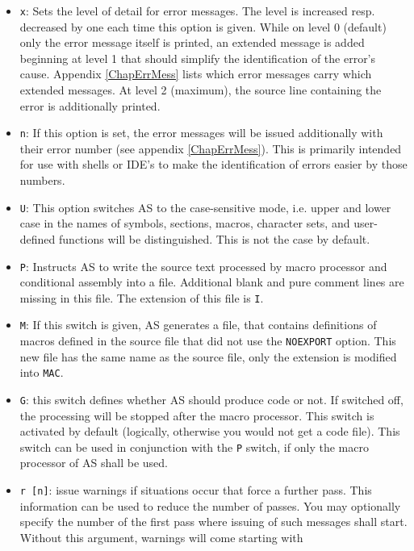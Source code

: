 \documentclass[12pt,twoside]{report}
\newcommand{\tty}[1]{{\tt #1}}
\begin{document}
\begin{itemize}
{      this depends on the sources.}
\item{\tty{x}: Sets the level of detail for error messages.  The level
      is increased resp. decreased by one each time this option is given.
      While on level 0 (default) only the error message itself is printed,
      an extended message is added beginning at level 1 that should
      simplify the identification of the error's cause.  Appendix
      \ref{ChapErrMess} lists which error messages carry which extended
      messages.  At level 2 (maximum), the source line containing the
      error is additionally printed.}
\item{\tty{n}: If this option is set, the error messages will be issued 
      additionally with their error number (see appendix
      \ref{ChapErrMess}).  This is primarily intended for use with shells
      or IDE's to make the identification of errors easier by those
      numbers.}
\item{\tty{U}: This option switches AS to the case-sensitive mode, i.e. 
      upper and lower case in the names of symbols, sections, macros,
      character sets, and user-defined functions will be distinguished.
      This is not the case by default.}
\item{\tty{P}: Instructs AS to write the source text processed by macro 
      processor and conditional assembly into a file.  Additional 
      blank and pure comment lines are missing in this file.  The 
      extension of this file is \tty{I}.}
\item{\tty{M}: If this switch is given, AS generates a file, that contains 
      definitions of macros defined in the source file that did not
      use the \tty{NOEXPORT} option.  This new file has the same name as
      the source file, only the extension is modified into \tty{MAC}.}
\item{\tty{G}: this switch defines whether AS should produce code or not. 
      If switched off, the processing will be stopped after the macro 
      processor. This switch is activated by default (logically, 
      otherwise you would not get a code file). This switch can be
      used in conjunction with the \tty{P} switch, if only the macro
      processor of AS shall be used.}
\item{\tty{r [n]}: issue warnings if situations occur that force a further 
      pass. This information can be used to reduce the number of 
      passes.  You may optionally specify the number of the 
      first pass where issuing of such messages shall start.
      Without this argument, warnings will come starting with
}
\end{itemize}
\end{document}
